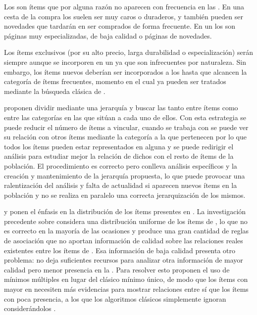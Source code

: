 \ABIERTO

Los \irs son ítems que por alguna razón no aparecen con frecuencia en las \transacciones. En una cesta de la compra los \irs suelen ser muy caros o duraderos, y también pueden ser novedades que tardarán en ser comprados de forma frecuente. En un \portalWeb los \irs son páginas muy especializadas, de baja calidad o páginas de novedades.

Los ítems exclusivos (por su alto precio, larga durabilidad o especialización) serán siempre \irs aunque se incorporen en un \sr ya que son infrecuentes por naturaleza. Sin embargo, los ítems nuevos deberían ser incorporados a los \srs hasta que alcancen la categoría de ítems frecuentes, momento en el cual ya pueden ser tratados mediante la búsqueda clásica de \ar.

\citet{HanFu-DiscoveryMultipleLevelARFromLargeDB-1995} proponen dividir \D mediante una jerarquía y buscar las \ars tanto entre ítems como entre las categorías en las que sitúan a cada uno de ellos. Con esta estrategia se puede reducir el número de ítems a vincular, cuando se trabaja con \irs se puede ver su relación con otros ítems mediante la categoría a la que pertenecen por lo que todos los ítems pueden estar representados en alguna \ar y se puede redirigir el análisis para estudiar mejor la relación de dichos \irs con el resto de ítems de la población. El procedimiento es correcto pero conlleva análisis específicos y la creación y mantenimiento de la jerarquía propuesta, lo que puede provocar una ralentización del análisis y falta de actualidad si aparecen nuevos ítems en la población y no se realiza en paralelo una correcta jerarquización de los mismos.







\citet{LiuHsuMa-ARMWithMultipleMS-1999} y \citet{PalshikarKaleApte-ARMUsingHeavyItemsets-2007} ponen el énfasis en la distribución de los ítems presentes en \D. La investigación precedente sobre \arm considera una distribución uniforme de los ítems de \D, lo que no es correcto en la mayoría de las ocasiones y produce una gran cantidad de reglas de asociación que no aportan información de calidad sobre las relaciones reales existentes entre los ítems de \D. Esa información de baja calidad presenta otro problema: no deja suficientes recursos para analizar otra información de mayor calidad pero menor presencia en la \db. Para resolver esto proponen el uso de \soportes mínimos múltiples en lugar del clásico \soporte mínimo único, de modo que los ítems con mayor \soporte en \D necesiten más evidencias para mostrar relaciones entre sí que los ítems con poca presencia, a los que los algoritmos clásicos simplemente ignoran considerándolos \irs.

